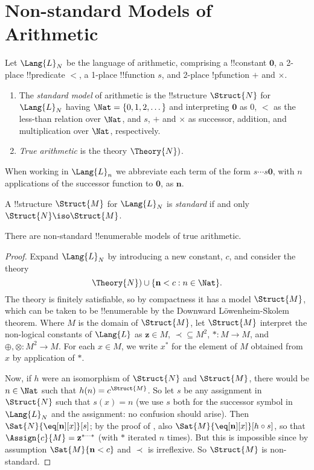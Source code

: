 \documentclass[../../include/open-logic-section]{subfiles}
\begin{document}
\section{Non-standard Models of Arithmetic}

\begin{defn}
  Let $\Lang{L}_N$ be the language of arithmetic, comprising a
  !!{constant} $\mathbf{0}$, a 2-place !!{predicate} $<$, a 1-place
  !!{function} $s$, and 2-place !p{function} $+$ and
  $\times$. 
  \begin{enumerate}
  \item The \emph{standard model} of arithmetic is the !!{structure}
    $\Struct{N}$ for $\Lang{L}_N$ having $\Nat = \{ 0, 1, 2,
    \dots\}$ and interpreting $\mathbf{0}$ as $0$, $<$ as the
    less-than relation over $\Nat$, and $s$, $+$ and $\times$ as
    successor, addition, and multiplication over $\Nat$,
    respectively.
  \item \emph{True arithmetic} is the theory
    $\Theory{N})$.
  \end{enumerate}
\end{defn}

When working in $\Lang{L}_n$ we abbreviate each term of
the form $s \cdots s\mathbf{0}$, with $n$ applications of the
successor function to $\mathbf{0}$, as $\mathbf{n}$.

\begin{defn}
  A !!{structure} $\Struct{M}$ for $\Lang{L}_N$ is \emph{standard} if
  and only $\Struct{N} \iso \Struct{M}$.
\end{defn}

\begin{thm}
  There are non-standard !!{enumerable} models of true arithmetic.
\end{thm}

\begin{proof}
  Expand $\Lang{L}_N$ by introducing a new constant, $c$, and
  consider the theory 
  \[
  \Theory{N}) \cup \{\mathbf{n} < c
  : n \in \Nat \}.
  \]
  The theory is finitely satisfiable, so by compactness it has a model
  $\Struct{M}$, which can be taken to be !!{enumerable} by the Downward
  L\"owenheim-Skolem theorem. Where $M$ is the domain of
  $\Struct{M}$, let $\Struct{M}$ interpret the non-logical
  constants of $\Lang{L}$ as $\mathbf{z} \in M$, ${\prec} \subseteq
  M^2$, $* : M \to M$, and $\oplus, \otimes : M^2 \to M$. For
  each $x \in M$, we write $x^*$ for the element of $M$ obtained from
  $x$ by application of $*$.

  Now, if $h$ were an isomorphism of $\Struct{N}$ and $\Struct{M}$,
  there would be $n \in \Nat$ such that $h(n) = c^\Struct{M}$.  So let
  $s$ be any assignment in $\Struct{N}$ such that $s(x) = n$ (we use
  $s$ both for the successor symbol in $\Lang{L}_N$ and the
  assignment: no confusion should arise). Then
  $\Sat{N}{\eq[\mathbf{n}][x]}[s]$; by the proof of ,
  also $\Sat{M}{\eq[\mathbf{n}][x]}[h\circ s]$, so that $\Assign{c}{M}
  = \mathbf{z}^{*\cdots *}$ (with $*$ iterated $n$ times). But this is
  impossible since by assumption $\Sat{M}{\mathbf{n} < c}$ and $\prec$
  is irreflexive. So $\Struct{M}$ is non-standard.
\end{proof}
\end{document}
